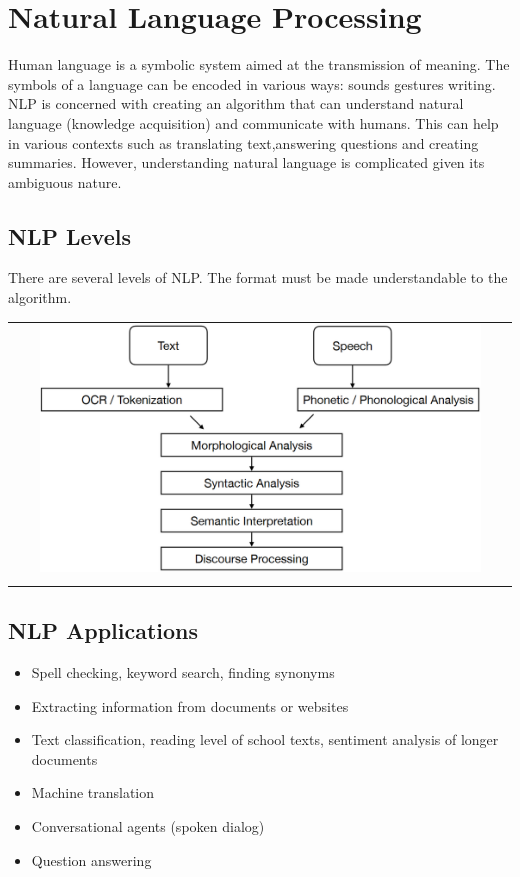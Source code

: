 \section{Natural Language Processing}
Human language is a symbolic system aimed at the transmission of meaning.
The symbols of a language can be encoded in various ways: sounds gestures writing. \\
\vspace{1em}
NLP is concerned with creating an algorithm that can understand natural language (knowledge acquisition) and communicate with humans.
This can help in various contexts such as translating text,answering questions and creating summaries.
However, understanding natural language is complicated given its ambiguous nature.

\subsection{NLP Levels}
There are several levels of NLP.
The format must be made understandable to the algorithm.
\begin{center}
    \begin{tabular}{c}
        \\ \includegraphics[width=0.9\textwidth]{images/NPL1.png} \\ \\
    \end{tabular}
\end{center}

\subsection{NLP Applications}
\begin{itemize}
    \item Spell checking, keyword search, finding synonyms
    \item Extracting information from documents or websites
    \item Text classification, reading level of school texts, sentiment analysis of longer documents
    \item Machine translation
    \item Conversational agents (spoken dialog)
    \item Question answering
\end{itemize}

